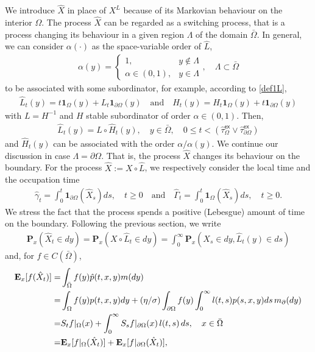 \documentclass[11pt,a4paper]{article}
\begin{document}
We introduce $\hat{X}$ in place of $X^L$ because of its Markovian behaviour on the interior $\Omega$. The process $\hat{X}$ can be regarded as a switching process, that is a process changing its behaviour in a given region $\Lambda$ of the domain $\bar{\Omega}$. In general, we can consider $\alpha(\cdot)$ as the space-variable order of $\hat{L}$,
\begin{align*}
\alpha(y) = 
\left\lbrace
\begin{array}{ll}
1, & y \notin \Lambda\\
\alpha \in (0,1), & y \in \Lambda
\end{array}
\right.
, \quad \Lambda \subset \bar{\Omega}
\end{align*} 
to be associated with some subordinator, for example, according to \eqref{def1L},
\begin{align*}
\hat{L}_t (y) = t \mathbf{1}_{\Omega}(y) + L_t \mathbf{1}_{\partial \Omega}(y) \quad \textrm{and} \quad \hat{H}_t (y) = H_t \mathbf{1}_{\Omega}(y) + t \mathbf{1}_{\partial \Omega}(y)
\end{align*}
with $L=H^{-1}$ and $H$ stable subordinator of order $\alpha \in (0,1)$. Then,
\begin{align*}
\hat{L}_t(y) = L \circ \hat{H}_t(y), \quad y \in \bar{\Omega}, \quad 0 \leq t < (\hat{\tau}^\mathsf{ex}_\Omega \vee \hat{\tau}^\mathsf{ex}_{\partial \Omega})
\end{align*}
and $\hat{H}_t(y)$ can be associated with the order $\alpha/\alpha(y)$. We continue our discussion in case $\Lambda=\partial \Omega$. That is, the process $\hat{X}$ changes its behaviour on the boundary. For the process $\hat{X} := X \circ \hat{L}$, we respectively consider the local time and the occupation time
\begin{align*}
\hat{\gamma}_t = \int_0^t \mathbf{1}_{\partial \Omega} (\hat{X}_s) ds, \quad t\geq 0 \quad \textrm{and} \quad \hat{\Gamma}_t = \int_0^t \mathbf{1}_{\Omega} (\hat{X}_s) ds, \quad t\geq 0.
\end{align*}
We stress the fact that the process spends a positive (Lebesgue) amount of time on the boundary. Following the previous section, we write
\begin{align*}
\mathbf{P}_x(\hat{X}_t \in dy) = \mathbf{P}_x(X \circ \hat{L}_t \in dy) = \int_0^\infty \mathbf{P}_x ( X_s \in dy,  \hat{L}_t(y) \in ds) 
\end{align*}
and, for $f \in C(\bar{\Omega})$,
\begin{align}
\label{repS}
\mathbf{E}_x[f(\hat{X}_t)]
= & \int_{\bar{\Omega}} f(y) \hat{p}(t,x,y) m(dy) \\
= & \int_\Omega f(y) p(t,x,y) dy + (\eta/\sigma)\int_{\partial \Omega} f(y) \int_0^\infty l(t,s) p(s,x,y)ds\, m_\partial(dy) \notag \\
= & S_t f|_\Omega (x) + \int_0^\infty  S_s f|_{\partial \Omega} (x)\,l(t,s)\, ds, \quad x \in \bar{\Omega}\notag \\  
= & \mathbf{E}_x[f|_{\Omega}(\hat{X}_t)] + \mathbf{E}_x[f|_{\partial \Omega}(\hat{X}_t)], \notag
\end{align}
\end{document}
